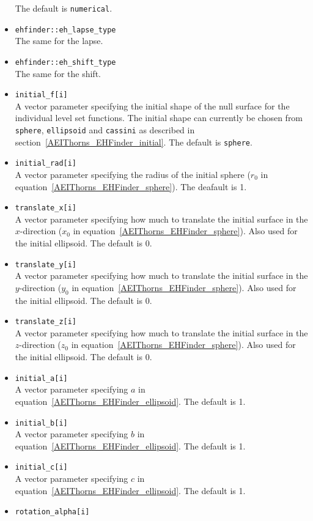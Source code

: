 \begin{itemize}
  The default is {\tt numerical}.
\item {\tt ehfinder::eh\_lapse\_type} \\
  The same for the lapse.
\item {\tt ehfinder::eh\_shift\_type} \\
  The same for the shift.
\item {\tt initial\_f[i]} \\
  A vector parameter specifying the initial shape of the null surface for
  the individual level set functions. The initial shape can currently be
  chosen from {\tt sphere}, {\tt ellipsoid} and {\tt cassini} as described in
  section~\ref{AEIThorns_EHFinder_initial}. The default is {\tt sphere}.
\item {\tt initial\_rad[i]} \\
  A vector parameter specifying the radius of the initial sphere ($r_{0}$ in
  equation~\ref{AEIThorns_EHFinder_sphere}). The deafault is 1.
\item {\tt translate\_x[i]} \\
  A vector parameter specifying how much to translate the initial surface in
  the $x$-direction ($x_{0}$ in equation~\ref{AEIThorns_EHFinder_sphere}).
  Also used for the initial ellipsoid. The default is 0.
\item {\tt translate\_y[i]} \\
  A vector parameter specifying how much to translate the initial surface in
  the $y$-direction ($y_{0}$ in equation~\ref{AEIThorns_EHFinder_sphere}).
  Also used for the initial ellipsoid. The default is 0.
\item {\tt translate\_z[i]} \\
  A vector parameter specifying how much to translate the initial surface in
  the $z$-direction ($z_{0}$ in equation~\ref{AEIThorns_EHFinder_sphere}).
  Also used for the initial ellipsoid. The default is 0.
\item {\tt initial\_a[i]} \\
  A vector parameter specifying $a$ in
  equation~\ref{AEIThorns_EHFinder_ellipsoid}. The default is 1.
\item {\tt initial\_b[i]} \\
  A vector parameter specifying $b$ in
  equation~\ref{AEIThorns_EHFinder_ellipsoid}. The default is 1.
\item {\tt initial\_c[i]} \\
  A vector parameter specifying $c$ in
  equation~\ref{AEIThorns_EHFinder_ellipsoid}. The default is 1.
\item {\tt rotation\_alpha[i]} \\

\end{itemize}

